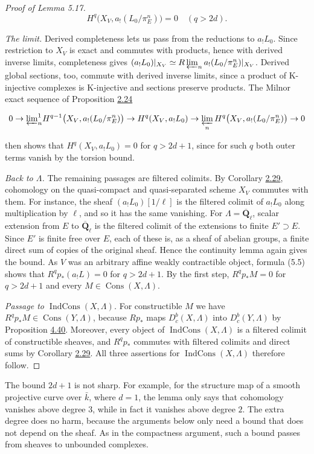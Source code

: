 \documentclass[11pt]{article}
\providecommand{\Cons}{}\renewcommand{\Cons}{\operatorname{Cons}}
\providecommand{\Dbc}{}\renewcommand{\Dbc}{D^b_c}
\providecommand{\IndCons}{}\renewcommand{\IndCons}{\operatorname{IndCons}}
\begin{document}
\begin{proof}[{Proof of Lemma 5.17}]
\[
H^q\bigl(X_V,a_!(L_0/\pi_E^n)\bigr)=0\quad(q>2d).
\]

\emph{The limit.} Derived completeness lets us pass from the reductions to \(a_!L_0\). Since restriction to \(X_V\) is exact and commutes with products, hence with derived inverse limits, completeness gives \((a_!L_0)|_{X_V}\simeq R\varprojlim_n a_!(L_0/\pi_E^n)|_{X_V}\). Derived global sections, too, commute with derived inverse limits, since a product of K-injective complexes is K-injective and sections preserve products. The Milnor exact sequence of Proposition \hyperref[bp71]{2.24}

\[
0\to{\textstyle\varprojlim^1_n}H^{q-1}\bigl(X_V,a_!(L_0/\pi_E^n)\bigr)
\to H^q(X_V,a_!L_0)
\to\varprojlim_nH^q\bigl(X_V,a_!(L_0/\pi_E^n)\bigr)\to0
\]

then shows that \(H^q(X_V,a_!L_0)=0\) for \(q>2d+1\), since for such \(q\) both outer terms vanish by the torsion bound.

\emph{Back to \(\Lambda\).} The remaining passages are filtered colimits. By Corollary \hyperref[bp86]{2.29}, cohomology on the quasi-compact and quasi-separated scheme \(X_V\) commutes with them. For instance, the sheaf \((a_!L_0)[1/\ell]\) is the filtered colimit of \(a_!L_0\) along multiplication by \(\ell\), and so it has the same vanishing. For \(\Lambda=\overline{\mathbf Q}_\ell\), scalar extension from \(E\) to \(\overline{\mathbf Q}_\ell\) is the filtered colimit of the extensions to finite \(E'\supset E\). Since \(E'\) is finite free over \(E\), each of these is, as a sheaf of abelian groups, a finite direct sum of copies of the original sheaf. Hence the continuity lemma again gives the bound. As \(V\) was an arbitrary affine weakly contractible object, formula (5.5) shows that \(R^qp_*(a_!L)=0\) for \(q>2d+1\). By the first step, \(R^qp_*M=0\) for \(q>2d+1\) and every \(M\in\Cons(X,\Lambda)\).

\emph{Passage to \(\IndCons(X,\Lambda)\).} For constructible \(M\) we have \(R^qp_*M\in\Cons(Y,\Lambda)\), because \(Rp_*\) maps \(\Dbc(X,\Lambda)\) into \(\Dbc(Y,\Lambda)\) by Proposition \hyperref[bp405]{4.40}. Moreover, every object of \(\IndCons(X,\Lambda)\) is a filtered colimit of constructible sheaves, and \(R^qp_*\) commutes with filtered colimits and direct sums by Corollary \hyperref[bp86]{2.29}. All three assertions for \(\IndCons(X,\Lambda)\) therefore follow.
\end{proof}

\label{bp466}%
The bound \(2d+1\) is not sharp. For example, for the structure map of a smooth projective curve over \(\bar k\), where \(d=1\), the lemma only says that cohomology vanishes above degree \(3\), while in fact it vanishes above degree \(2\). The extra degree does no harm, because the arguments below only need a bound that does not depend on the sheaf. As in the compactness argument, such a bound passes from sheaves to unbounded complexes.
\end{document}

